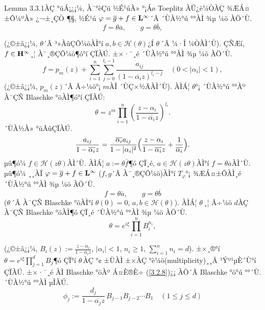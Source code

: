 \documentclass[12pt,a4paper,2sided]{article}
\newcommand{\vs}{\vspace}
\begin{document}
\vs{0.2cm} Lemma 3.3.1ÀÇ °üÁ¡¿¡¼­, À¯°èÇü ½É¹úÀ» °¡Áø Toeplitz
ÀÛ¿ë¼ÒÀÇ ¾ÆÁ¤±Ô¼ºÀ» ¿¬±¸ÇÒ ¶§, ½É¹ú $\varphi= \overline{g}+ f \in
\bold L^{\infty}$´Â ´ÙÀ½°ú °°ÀÌ ¾µ ¼ö ÀÖ´Ù.
\begin{equation}\label{3.2.7}
f=\theta \overline{a},\quad \quad g=\theta \overline{b},
\end{equation}

\newpage{}

 \vspace{.8 cm} \noindent (¿©±â¿¡¼­, $\theta$´Â
³»ÀûÇÔ¼öÀÌ°í $a,b \in \mathcal H (\theta)$¿Í $\theta$\,´Â ¼­·Î
¼ÒÀÌ´Ù). ÇÑÆí, $f \in \bold H^{\infty}$¸¦ À¯¸®ÇÔ¼ö¶ó°í ÇÏÀÚ. ±×·¯¸é
´ÙÀ½°ú °°ÀÌ ¾µ ¼ö ÀÖ´Ù.
$$
f=p_m(z)+\sum_{i=1}^n \sum_{j=0}^{l_i -1}
\frac{a_{ij}}{(1-\overline{\alpha_i}z)^{l_i -j}} \quad
(0<|\alpha_i|<1),
$$
(¿©±â¿¡¼­, $p_m(z)$´Â Â÷¼ö°¡ $m$ÀÎ ´ÙÇ×½ÄÀÌ´Ù). ÀÌÁ¦ $\theta$°¡
´ÙÀ½°ú °°Àº À¯ÇÑ Blaschke °öÀÌ¶ó°í ÇÏÀÚ:
$$
\theta=z^{m} \prod_{i=1}^{n} \left(\frac{z- \alpha_i}{1- \overline{\alpha_i}z}\right)^{l_i}.
$$
´ÙÀ½À» °üÂûÇÏÀÚ.
$$
\frac{a_{ij}}{1-\overline{\alpha_i}z}=
\frac{\overline{\alpha_i}a_{ij}}{1 - |\alpha_i|^2}
\Bigl(\frac{z-\alpha_i}{1- \overline{\alpha_i}z}
+\frac{1}{\overline{\alpha_i}} \Bigr).
$$
µû¶ó¼­ $f \in \mathcal H (z\theta)$ÀÌ´Ù. ÀÌÁ¦ $a := \theta
\overline{f}$¶ó ÇÏ¸é, $a \in \mathcal H (z \theta)$ÀÌ°í  $f= \theta
\overline{a}$ÀÌ´Ù. µû¶ó¼­ ¸¸ÀÏ $\varphi = \overline{g} + f \in \bold
L^{\infty}$ ($f,g$´Â À¯¸®ÇÔ¼ö)ÀÌ°í $T_{\varphi}$°¡ ¾ÆÁ¤±ÔÀÌ¸é ´ÙÀ½°ú
°°ÀÌ ¾µ ¼ö ÀÖ´Ù.
$$
f=\theta \overline{a},\quad\quad g=\theta \overline{b}
$$
($\theta$\,´Â À¯ÇÑ Blaschke °öÀÌ°í $\theta (0)=0$, $a,b \in \mathcal
H (\theta)$). ÀÌÁ¦ $\theta$\,¸¦ Â÷¼ö $d$\;ÀÇ À¯ÇÑ Blaschke °öÀÌ¶ó
ÇÏ¸é ´ÙÀ½°ú °°ÀÌ ¾µ ¼ö ÀÖ´Ù.
\begin{equation}\label{3.2.8}
\theta = e^{i \xi} \prod_{i=1}^n B_i ^{n_i},
\end{equation}

\noindent (¿©±â¿¡¼­, $B_i(z) := \frac{z- \alpha_i}{1-
\overline{\alpha_i}z}$, $|\alpha_i| < 1$, $n_i \geq 1$,
$\sum_{i=1}^n n_i =d$). ±×¸®°í $\theta =e^{i\xi} \prod_{j=1}^d B_j
$¶ó ÇÏ°í $\theta$\,ÀÇ °¢ ±ÙÀÌ ±×ÀÇ °è¼ö(multiplicity)¸¸Å­ ¹Ýº¹µÈ´Ù°í
ÇÏÀÚ. ±×·¯¸é ÀÌ Blaschke °öÀº Á¤È®È÷ (\ref{3.2.8})¿¡ ÀÖ´Â Blaschke
°ö°ú °°´Ù. ´ÙÀ½°ú °°ÀÌ µÎÀÚ.
\begin{equation}\label{3.2.9}
\phi_j :=\frac{d_j}{1- \overline{\alpha_j}z}\,B_{j-1}B_{j-2} \cdots
B_1 \quad (1 \leq j \leq d)
\end{equation}
\end{document}
